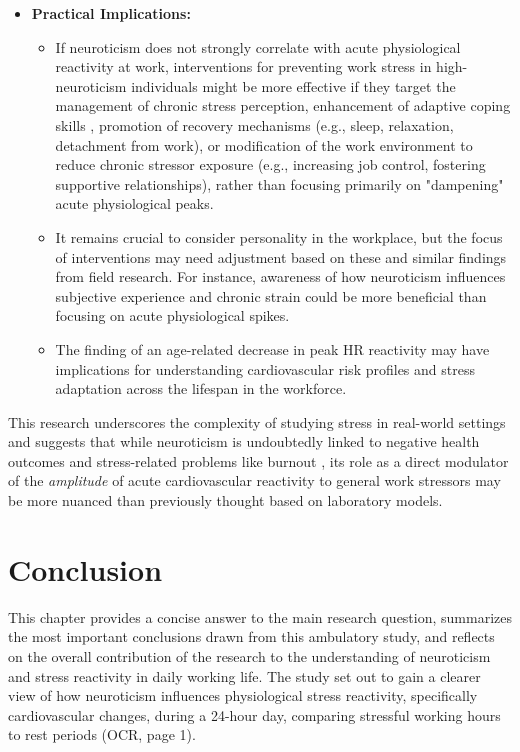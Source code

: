 \documentclass[11pt, a4paper]{report}
\begin{document}
\begin{itemize}
    \item \textbf{Practical Implications:}
        \begin{itemize}
            \item If neuroticism does not strongly correlate with acute physiological reactivity at work, interventions for preventing work stress in high-neuroticism individuals might be more effective if they target the management of chronic stress perception, enhancement of adaptive coping skills \cite{ConnorSmithFlachsbart2007}, promotion of recovery mechanisms (e.g., sleep, relaxation, detachment from work), or modification of the work environment to reduce chronic stressor exposure (e.g., increasing job control, fostering supportive relationships), rather than focusing primarily on "dampening" acute physiological peaks.
            \item It remains crucial to consider personality in the workplace, but the focus of interventions may need adjustment based on these and similar findings from field research. For instance, awareness of how neuroticism influences subjective experience and chronic strain could be more beneficial than focusing on acute physiological spikes.
            \item The finding of an age-related decrease in peak HR reactivity may have implications for understanding cardiovascular risk profiles and stress adaptation across the lifespan in the workforce.
        \end{itemize}
\end{itemize}
This research underscores the complexity of studying stress in real-world settings and suggests that while neuroticism is undoubtedly linked to negative health outcomes and stress-related problems like burnout \cite{Bianchi2018}, its role as a direct modulator of the \textit{amplitude} of acute cardiovascular reactivity to general work stressors may be more nuanced than previously thought based on laboratory models.


\chapter{Conclusion}
\label{ch:conclusion_main} %

This chapter provides a concise answer to the main research question, summarizes the most important conclusions drawn from this ambulatory study, and reflects on the overall contribution of the research to the understanding of neuroticism and stress reactivity in daily working life. The study set out to gain a clearer view of how neuroticism influences physiological stress reactivity, specifically cardiovascular changes, during a 24-hour day, comparing stressful working hours to rest periods \cite{ThesisTempPDF} (OCR, page 1).
\end{document}

